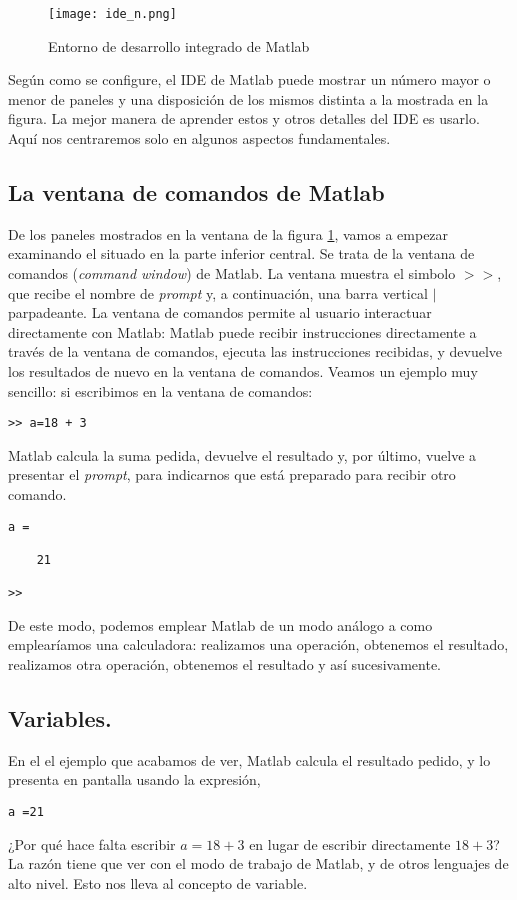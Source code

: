 \begin{figure}[h]
	\centering
		\texttt{[image: ide\_n.png]}
	\caption{Entorno de desarrollo integrado de Matlab}
	\label{fig:ide}
\end{figure}

Según como se configure, el IDE de Matlab puede mostrar un número mayor o menor de paneles y una disposición de los mismos distinta a la mostrada en la figura. La mejor manera de aprender estos y otros detalles del IDE es usarlo. Aquí nos centraremos solo en algunos aspectos fundamentales.

\subsection{La ventana de comandos de Matlab} 
De los paneles mostrados en la ventana de la figura \ref{fig:ide}, vamos a empezar examinando el situado en la parte inferior central. Se trata de la ventana de comandos (\emph{command window}) de Matlab.   La ventana muestra el simbolo $>>$, que recibe el nombre de \emph{prompt} y, a continuación, una barra vertical $|$ parpadeante.  La ventana de comandos permite al usuario interactuar directamente con Matlab: Matlab puede recibir instrucciones directamente a través de la ventana de comandos, ejecuta las instrucciones recibidas, y devuelve los resultados de nuevo en la ventana de comandos. Veamos un ejemplo muy sencillo: si escribimos en la ventana de comandos:

\begin{verbatim}
>> a=18 + 3
\end{verbatim}

Matlab calcula la suma pedida, devuelve el resultado y, por último, vuelve a presentar el \emph{prompt}, para indicarnos que está preparado para recibir otro comando.

\begin{verbatim}
a =

    21

>> 
\end{verbatim}

De este modo, podemos emplear Matlab de un modo análogo a como emplearíamos una calculadora: realizamos una operación, obtenemos el resultado, realizamos otra operación, obtenemos el resultado  y así sucesivamente.
\subsection{Variables.} 
En el el ejemplo que acabamos de ver, Matlab calcula el resultado pedido, y lo presenta en pantalla usando la expresión, \begin{verbatim}
a =21
\end{verbatim} ¿Por qué hace falta escribir $a=18+3$ en lugar de escribir directamente $18+3$? La razón tiene que ver con el modo de trabajo de Matlab, y de otros lenguajes de alto nivel. Esto nos lleva al concepto de variable. 

